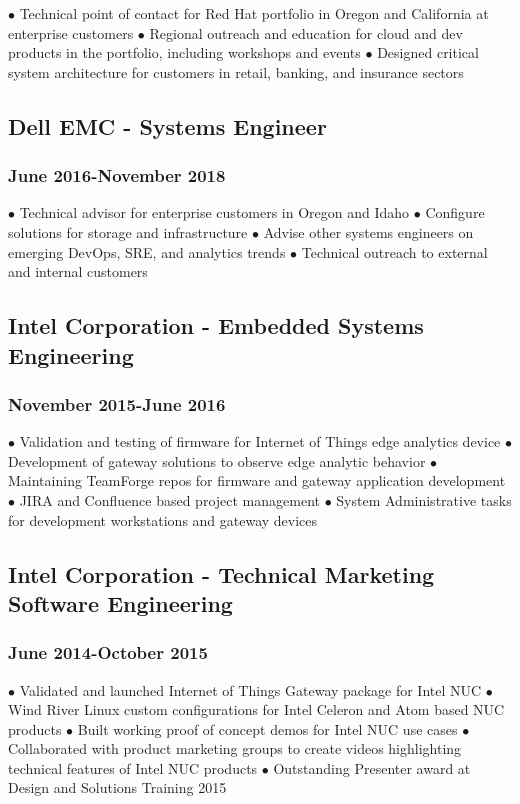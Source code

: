 \documentclass{article}
\begin{document}
$\bullet$ Technical point of contact for Red Hat portfolio in Oregon and California at enterprise customers
$\bullet$ Regional outreach and education for cloud and dev products in the portfolio, including workshops and events
$\bullet$ Designed critical system architecture for customers in retail, banking, and insurance sectors

\subsection*{Dell EMC - Systems Engineer}
\subsubsection*{June 2016-November 2018}

$\bullet$ Technical advisor for enterprise customers in Oregon and Idaho
$\bullet$ Configure solutions for storage and infrastructure
$\bullet$ Advise other systems engineers on emerging DevOps, SRE, and analytics trends
$\bullet$ Technical outreach to external and internal customers

\subsection*{Intel Corporation - Embedded Systems Engineering}
\subsubsection*{November 2015-June 2016}

$\bullet$ Validation and testing of firmware for Internet of Things edge analytics device
$\bullet$ Development of gateway solutions to observe edge analytic behavior
$\bullet$ Maintaining TeamForge repos for firmware and gateway application development
$\bullet$ JIRA and Confluence based project management
$\bullet$ System Administrative tasks for development workstations and gateway devices


\subsection*{Intel Corporation - Technical Marketing Software Engineering}
\subsubsection*{June 2014-October 2015}

$\bullet$ Validated and launched Internet of Things Gateway package for Intel NUC
$\bullet$ Wind River Linux custom configurations for Intel Celeron and Atom based NUC products
$\bullet$ Built working proof of concept demos for Intel NUC use cases 
$\bullet$ Collaborated with product marketing groups to create videos highlighting technical features of Intel NUC products
$\bullet$ Outstanding Presenter award at Design and Solutions Training 2015  
\end{document}
